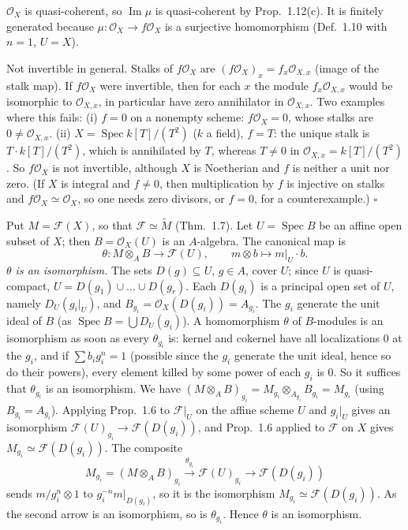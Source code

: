 \documentclass[11pt]{article}
\begin{document}
$\mathcal{O}_X$ is quasi-coherent, so $\operatorname{Im}\mu$ is quasi-coherent by Prop.~1.12(c). It is finitely generated because $\mu:\mathcal{O}_X\to f\mathcal{O}_X$ is a surjective homomorphism (Def.~1.10 with $n=1$, $U=X$).

Not invertible in general. Stalks of $f\mathcal{O}_X$ are $(f\mathcal{O}_X)_x=f_x\mathcal{O}_{X,x}$ (image of the stalk map). If $f\mathcal{O}_X$ were invertible, then for each $x$ the module $f_x\mathcal{O}_{X,x}$ would be isomorphic to $\mathcal{O}_{X,x}$, in particular have zero annihilator in $\mathcal{O}_{X,x}$. Two examples where this fails: (i) $f=0$ on a nonempty scheme: $f\mathcal{O}_X=0$, whose stalks are $0\neq\mathcal{O}_{X,x}$. (ii) $X=\operatorname{Spec}k[T]/(T^2)$ ($k$ a field), $f=T$: the unique stalk is $T\cdot k[T]/(T^2)$, which is annihilated by $T$, whereas $T\neq0$ in $\mathcal{O}_{X,x}=k[T]/(T^2)$. So $f\mathcal{O}_X$ is not invertible, although $X$ is Noetherian and $f$ is neither a unit nor zero. (If $X$ is integral and $f\neq0$, then multiplication by $f$ is injective on stalks and $f\mathcal{O}_X\simeq\mathcal{O}_X$, so one needs zero divisors, or $f=0$, for a counterexample.) \hfill$\square$

\pf
Put $M=\mathcal{F}(X)$, so that $\mathcal{F}\simeq\widetilde M$ (Thm.~1.7). Let $U=\operatorname{Spec}B$ be an affine open subset of $X$; then $B=\mathcal{O}_X(U)$ is an $A$-algebra. The canonical map is
\[ \theta:M\otimes_AB\to\mathcal{F}(U),\qquad m\otimes b\mapsto m|_U\cdot b. \]
\emph{$\theta$ is an isomorphism.} The sets $D(g)\subseteq U$, $g\in A$, cover $U$; since $U$ is quasi-compact, $U=D(g_1)\cup\dots\cup D(g_r)$. Each $D(g_i)$ is a principal open set of $U$, namely $D_U(g_i|_U)$, and $B_{g_i}=\mathcal{O}_X(D(g_i))=A_{g_i}$. The $g_i$ generate the unit ideal of $B$ (as $\operatorname{Spec}B=\bigcup D_U(g_i)$). A homomorphism $\theta$ of $B$-modules is an isomorphism as soon as every $\theta_{g_i}$ is: kernel and cokernel have all localizations $0$ at the $g_i$, and if $\sum b_ig_i^{n}=1$ (possible since the $g_i$ generate the unit ideal, hence so do their powers), every element killed by some power of each $g_i$ is $0$. So it suffices that $\theta_{g_i}$ is an isomorphism. We have $(M\otimes_AB)_{g_i}=M_{g_i}\otimes_{A_{g_i}}B_{g_i}=M_{g_i}$ (using $B_{g_i}=A_{g_i}$). Applying Prop.~1.6 to $\mathcal{F}|_U$ on the affine scheme $U$ and $g_i|_U$ gives an isomorphism $\mathcal{F}(U)_{g_i}\to\mathcal{F}(D(g_i))$, and Prop.~1.6 applied to $\mathcal{F}$ on $X$ gives $M_{g_i}\simeq\mathcal{F}(D(g_i))$. The composite
\[ M_{g_i}=(M\otimes_AB)_{g_i}\xrightarrow{\theta_{g_i}}\mathcal{F}(U)_{g_i}\to\mathcal{F}(D(g_i)) \]
sends $m/g_i^n\otimes1$ to $g_i^{-n}m|_{D(g_i)}$, so it is the isomorphism $M_{g_i}\simeq\mathcal{F}(D(g_i))$. As the second arrow is an isomorphism, so is $\theta_{g_i}$. Hence $\theta$ is an isomorphism.
\end{document}
